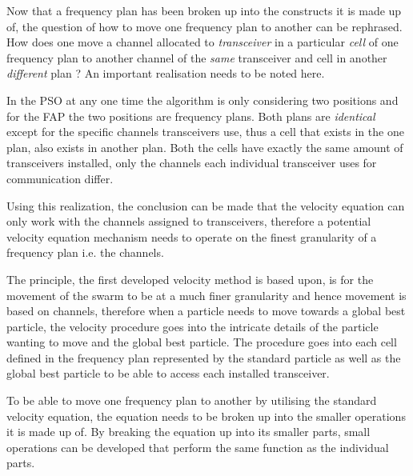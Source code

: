 Now that a frequency plan has been broken up into the constructs it is made up of, the question of how to move one frequency plan to another can be rephrased. How does one move a channel allocated to \emph{transceiver} in a particular \emph{cell} of one frequency plan to another channel of the \emph{same} transceiver and cell in another \emph{different} plan ? An important realisation needs to be noted here.

In the PSO at any one time the algorithm is only considering two positions and for the FAP the two positions are frequency plans. Both plans are \emph{identical} except for the specific channels transceivers use, thus a cell that exists in the one plan, also exists in another plan. Both the cells have exactly the same amount of transceivers installed, only the channels each individual transceiver uses for communication differ.

Using this realization, the conclusion can be made that the velocity equation can only work with the channels assigned to transceivers, therefore a potential velocity equation mechanism needs to operate on the finest granularity of a frequency plan i.e. the channels.

The principle, the first developed velocity method is based upon, is for the movement of the swarm to be at a much finer granularity and hence movement is based on channels, therefore when a particle needs to move towards a global best particle, the velocity procedure goes into the intricate details of the particle wanting to move and the global best particle. The procedure goes into each cell defined in the frequency plan represented by the standard particle as well as the global best particle to be able to access each installed transceiver.

To be able to move one frequency plan to another by utilising the standard velocity equation, the equation needs to be broken up into the smaller operations it is made up of. By breaking the equation up into its smaller parts, small operations can be developed that perform the same function as the individual parts. 

